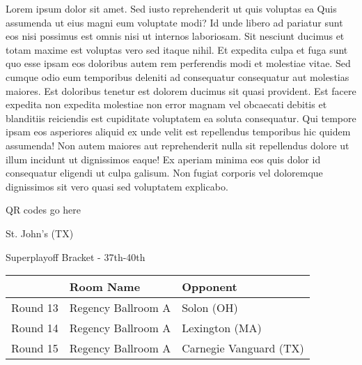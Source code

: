\documentclass{article}%
\begin{document}
\vspace*{8pt}%
\linebreak%
\newline%
\newline%
Lorem ipsum dolor sit amet. Sed iusto reprehenderit ut quis voluptas ea Quis assumenda ut eius magni eum voluptate modi? Id unde libero ad pariatur sunt eos nisi possimus est omnis nisi ut internos laboriosam. Sit nesciunt ducimus et totam maxime est voluptas vero sed itaque nihil. Et expedita culpa et fuga sunt quo esse ipsam eos doloribus autem rem perferendis modi et molestiae vitae.\newline%
\newline%
Sed cumque odio eum temporibus deleniti ad consequatur consequatur aut molestias maiores. Est doloribus tenetur est dolorem ducimus sit quasi provident. Est facere expedita non expedita molestiae non error magnam vel obcaecati debitis et blanditiis reiciendis est cupiditate voluptatem ea soluta consequatur. Qui tempore ipsam eos asperiores aliquid ex unde velit est repellendus temporibus hic quidem assumenda!\newline%
\newline%
Non autem maiores aut reprehenderit nulla sit repellendus dolore ut illum incidunt ut dignissimos eaque! Ex aperiam minima eos quis dolor id consequatur eligendi ut culpa galisum. Non fugiat corporis vel doloremque dignissimos sit vero quasi sed voluptatem explicabo.\newline%
\newline%
%
\vspace*{30pt}%
\begin{center}%
\begin{Huge}%
QR codes go here%
\end{Huge}%
\end{center}%
\newpage%
\begin{center}%
\begin{Huge}%
St. John's (TX)%
\end{Huge}%
\vspace*{8pt}%
\linebreak%
\begin{Large}%
Superplayoff Bracket {-} 37th{-}40th%
\end{Large}%
\end{center}%
%
\begin{tabularx}{\textwidth}{|c|Y|Y|}%
\hline%
&Room Name&Opponent\\%
\hline%
Round 13&Regency Ballroom A&Solon (OH)\\%
Round 14&Regency Ballroom A&Lexington (MA)\\%
Round 15&Regency Ballroom A&Carnegie Vanguard (TX)\\%
\hline%
\end{tabularx}%
\end{document}
